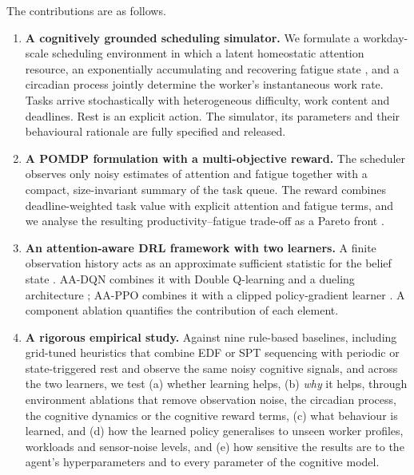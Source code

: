 The contributions are as follows.
\begin{enumerate}[label=(\roman*)]
  \item \textbf{A cognitively grounded scheduling simulator.} We formulate a workday-scale scheduling environment in which a latent homeostatic attention resource, an exponentially accumulating and recovering fatigue state \cite{jaber2010}, and a circadian process \cite{akerstedt1997,monk2005} jointly determine the worker's instantaneous work rate. Tasks arrive stochastically with heterogeneous difficulty, work content and deadlines. Rest is an explicit action. The simulator, its parameters and their behavioural rationale are fully specified and released.
  \item \textbf{A POMDP formulation with a multi-objective reward.} The scheduler observes only noisy estimates of attention and fatigue together with a compact, size-invariant summary of the task queue. The reward combines deadline-weighted task value with explicit attention and fatigue terms, and we analyse the resulting productivity--fatigue trade-off as a Pareto front \cite{roijers2013,hayes2022}.
  \item \textbf{An attention-aware DRL framework with two learners.} A finite observation history acts as an approximate sufficient statistic for the belief state \cite{singh1994,hausknecht2015,ni2022}. AA-DQN combines it with Double Q-learning \cite{vanhasselt2016} and a dueling architecture \cite{wang2016dueling}; AA-PPO combines it with a clipped policy-gradient learner \cite{schulman2017}. A component ablation quantifies the contribution of each element.
  \item \textbf{A rigorous empirical study.} Against nine rule-based baselines, including grid-tuned heuristics that combine EDF or SPT sequencing with periodic or state-triggered rest and observe the same noisy cognitive signals, and across the two learners, we test (a) whether learning helps, (b) \emph{why} it helps, through environment ablations that remove observation noise, the circadian process, the cognitive dynamics or the cognitive reward terms, (c) what behaviour is learned, and (d) how the learned policy generalises to unseen worker profiles, workloads and sensor-noise levels, and (e) how sensitive the results are to the agent's hyperparameters and to every parameter of the cognitive model.
\end{enumerate}


